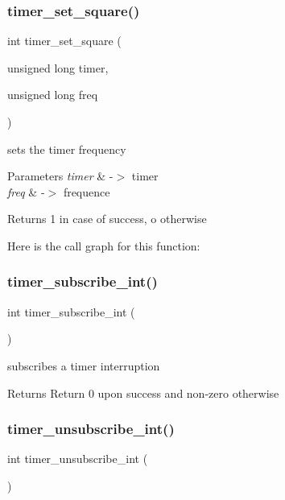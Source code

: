 \subsubsection{\texorpdfstring{timer\+\_\+set\+\_\+square()}{timer\_set\_square()}}
{\footnotesize\ttfamily int timer\+\_\+set\+\_\+square (\begin{DoxyParamCaption}\item[{unsigned long}]{timer,  }\item[{unsigned long}]{freq }\end{DoxyParamCaption})}



sets the timer frequency 


\begin{DoxyParams}{Parameters}
{\em timer} & -\/$>$ timer \\
\hline
{\em freq} & -\/$>$ frequence \\
\hline
\end{DoxyParams}
\begin{DoxyReturn}{Returns}
1 in case of success, o otherwise 
\end{DoxyReturn}
Here is the call graph for this function\+:
\hypertarget{group__timer_ga915070da84f7a3baa2e0fe634cb4bcd8}{}\label{group__timer_ga915070da84f7a3baa2e0fe634cb4bcd8} 
\subsubsection{\texorpdfstring{timer\+\_\+subscribe\+\_\+int()}{timer\_subscribe\_int()}}
{\footnotesize\ttfamily int timer\+\_\+subscribe\+\_\+int (\begin{DoxyParamCaption}{ }\end{DoxyParamCaption})}



subscribes a timer interruption 

\begin{DoxyReturn}{Returns}
Return 0 upon success and non-\/zero otherwise 
\end{DoxyReturn}
\hypertarget{group__timer_gab9eea51549744bca5c5c923b388bb4ee}{}\label{group__timer_gab9eea51549744bca5c5c923b388bb4ee} 
\subsubsection{\texorpdfstring{timer\+\_\+unsubscribe\+\_\+int()}{timer\_unsubscribe\_int()}}
{\footnotesize\ttfamily int timer\+\_\+unsubscribe\+\_\+int (\begin{DoxyParamCaption}{ }\end{DoxyParamCaption})}



